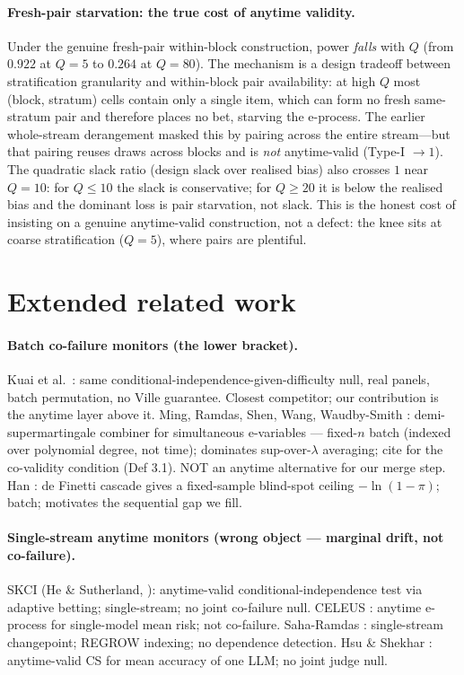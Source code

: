 \documentclass{article}
\begin{document}
\paragraph{Fresh-pair starvation: the true cost of anytime validity.}
Under the genuine fresh-pair within-block construction, power \emph{falls} with
$Q$ (from $0.922$ at $Q=5$ to $0.264$ at $Q=80$). The mechanism is a design
tradeoff between stratification granularity and within-block pair availability:
at high $Q$ most (block, stratum) cells contain only a single item, which can
form no fresh same-stratum pair and therefore places no bet, starving the
e-process. The earlier whole-stream derangement masked this by pairing across the
entire stream---but that pairing reuses draws across blocks and is \emph{not}
anytime-valid (Type-I $\to 1$). The quadratic slack ratio (design slack over
realised bias) also crosses $1$ near $Q=10$: for $Q\le 10$ the slack is
conservative; for $Q\ge 20$ it is below the realised bias and the dominant loss
is pair starvation, not slack. This is the honest cost of insisting on a genuine
anytime-valid construction, not a defect: the knee sits at coarse stratification
($Q=5$), where pairs are plentiful.

\section{Extended related work}
\label{app:related}

\paragraph{Batch co-failure monitors (the lower bracket).}
Kuai et al.\ \citep{kuai2604}: same conditional-independence-given-difficulty
null, real panels, batch permutation, no Ville guarantee. Closest competitor; our
contribution is the anytime layer above it. Ming, Ramdas, Shen, Wang,
Waudby-Smith \citep{ming2603}: demi-supermartingale combiner for simultaneous
e-variables --- fixed-$n$ batch (indexed over polynomial degree, not time);
dominates sup-over-$\lambda$ averaging; cite for the co-validity condition (Def
3.1). NOT an anytime alternative for our merge step. Han \citep{han2607}: de
Finetti cascade gives a fixed-sample blind-spot ceiling $-\ln(1-\pi)$; batch;
motivates the sequential gap we fill.

\paragraph{Single-stream anytime monitors (wrong object --- marginal drift, not
co-failure).}
SKCI (He \& Sutherland, \citep{he2606}): anytime-valid conditional-independence
test via adaptive betting; single-stream; no joint co-failure null. CELEUS
\citep{celeus2606}: anytime e-process for single-model mean risk; not
co-failure. Saha-Ramdas \citep{saharamdas2607}: single-stream changepoint;
REGROW indexing; no dependence detection. Hsu \& Shekhar \citep{hsu2607}:
anytime-valid CS for mean accuracy of one LLM; no joint judge null.
\end{document}
